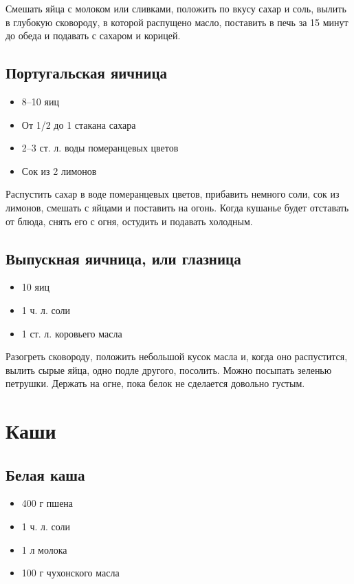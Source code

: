 Смешать яйца с молоком или сливками, положить по вкусу сахар и соль, вылить в глубокую сковороду, в которой распущено масло, поставить в печь за 15 минут до обеда и подавать с сахаром и корицей.

\subsection{Португальская яичница}

\begin{itemize}
	\item 8–10 яиц 
    \item От 1/2 до 1 стакана сахара 
    \item 2–3 ст. л. воды померанцевых цветов 
    \item Сок из 2 лимонов
\end{itemize}

Распустить сахар в воде померанцевых цветов, прибавить немного соли, сок из лимонов, смешать с яйцами и поставить на огонь. Когда кушанье будет отставать от блюда, снять его с огня, остудить и подавать холодным.

\subsection{Выпускная яичница, или глазница}

\begin{itemize}
	\item 10 яиц 
    \item 1 ч. л. соли 
    \item 1 ст. л. коровьего масла
\end{itemize}

Разогреть сковороду, положить небольшой кусок масла и, когда оно распустится, вылить сырые яйца, одно подле другого, посолить. Можно посыпать зеленью петрушки. Держать на огне, пока белок не сделается довольно густым.

\newpage
\section{Каши}

\subsection{Белая каша}

\begin{itemize}
	\item 400 г пшена 
    \item 1 ч. л. соли 
    \item 1 л молока
    \item 100 г чухонского масла
\end{itemize}

